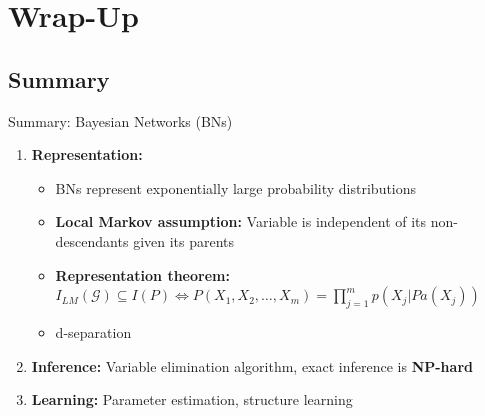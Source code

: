 \begin{frame}[plain]{}{}
	
\end{frame}


\section{Wrap-Up}

\subsection{Summary}

\begin{frame}{Summary: Bayesian Networks (BNs)}{}
	\begin{enumerate}
		\item \textbf{Representation:}
		\begin{itemize}
			\item BNs represent exponentially large probability distributions
			\item \textbf{Local Markov assumption:} Variable is independent of its non-descendants given its parents
			\item \textbf{Representation theorem:}
				$I_{LM}(\mathcal{G}) \subseteq I(P) \Leftrightarrow P(X_1, X_2, \dots, X_m) =
					\prod_{j=1}^m p(X_j \vert Pa(X_j))$
			\item d-separation
		\end{itemize}
		\item \textbf{Inference:} Variable elimination algorithm, exact inference is \textbf{NP-hard}
		\item \textbf{Learning:} Parameter estimation, structure learning
	\end{enumerate}
\end{frame}


